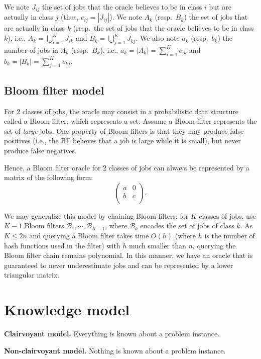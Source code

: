 \documentclass{article}
\begin{document}
We note \(J_{ij}\) the set of jobs that the oracle believes to be in class \(i\) but are actually in class \(j\) (thus,
\(e_{ij}=|J_{ij}|\)).
We note \(A_k\) (resp.\ \(B_k\)) the set of jobs that are actually in class \(k\) (resp.\ the set of jobs that the
oracle believes to be in class \(k\)), i.e., \(A_k=\bigcup_{i=1}^{K} J_{ik}\) and \(B_k=\bigcup_{j=1}^{K} J_{kj}\).
We also note \(a_k\) (resp.\ \(b_k\)) the number of jobs in \(A_k\) (resp.\ \(B_k\)), i.e.,
\(a_k=|A_k|=\sum_{i=1}^{K} e_{ik}\) and \(b_k=|B_k|=\sum_{j=1}^{K} e_{kj}\).

\subsection{Bloom filter model}

For 2 classes of jobs, the oracle may consist in a probabilistic data structure called a Bloom filter, which represents
a set. Assume a Bloom filter represents the set of \emph{large} jobs. One property of Bloom filters is that they may
produce false positives (i.e., the BF believes that a job is large while it is small), but never produce false
negatives.

Hence, a Bloom filter oracle for 2 classes of jobs can always be represented by a matrix of the following form:
\[
    \begin{pmatrix}
        a & 0 \\
        b & c \\
    \end{pmatrix}.
\]

We may generalize this model by chaining Bloom filters: for \(K\) classes of jobs, use \(K-1\) Bloom filters
\(\mathcal{B}_1,\cdots,\mathcal{B}_{K-1}\), where \(\mathcal{B}_k\) encodes the set of jobs of class \(k\).
As \(K\le 2n\) and querying a Bloom filter takes time \(O(h)\) (where \(h\) is the number of hash functions
used in the filter) with \(h\) much smaller than \(n\), querying the Bloom filter chain remains polynomial.
In this manner, we have an oracle that is guaranteed to never underestimate jobs and can be represented by a lower
triangular matrix.

\section{Knowledge model}

\noindent\textbf{Clairvoyant model.} Everything is known about a problem instance.

\noindent\textbf{Non-clairvoyant model.} Nothing is known about a problem instance.
\end{document}
